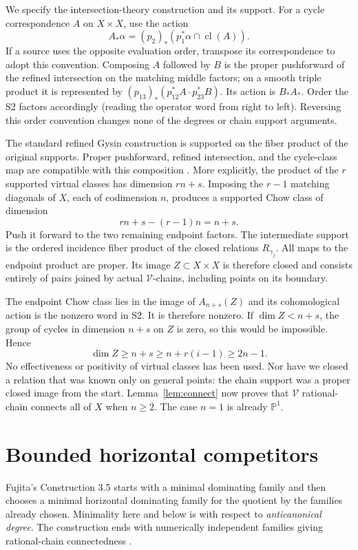 \documentclass[11pt]{article}
\theoremstyle{definition}\newtheorem{definition}[theorem]{Definition}
\theoremstyle{remark}\newtheorem{remark}[theorem]{Remark}
\newcommand{\PP}{\mathbb P}
\begin{document}
We specify the intersection-theory construction and its support. For a
cycle correspondence $A$ on $X\times X$, use the action
\[
 A_*\alpha=(p_2)_*(p_1^*\alpha\mathbin{\cap}\operatorname{cl}(A)).
\]
If a source uses the opposite evaluation order, transpose its correspondence
to adopt this convention. Composing $A$ followed by $B$ is the proper
pushforward of the refined intersection on the matching middle factors;
on a smooth triple product it is represented by
$(p_{13})_*(p_{12}^*A\cdot p_{23}^*B)$. Its action is $B_*A_*$.
Order the S2 factors accordingly (reading the operator word from right to
left). Reversing this order convention changes none of the degrees or chain
support arguments.

The standard refined Gysin construction is supported on the fiber product
of the original supports. Proper pushforward, refined intersection, and
the cycle-class map are compatible with this composition
\cite[\S\S6.2, 16.1, 19.1--19.2]{fulton}. More explicitly, the product of
the $r$ supported virtual classes has dimension $rn+s$. Imposing the
$r-1$ matching diagonals of $X$, each of codimension $n$, produces a
supported Chow class of dimension
\begin{equation}\label{eq:cycle-dim}
 rn+s-(r-1)n=n+s.
\end{equation}
Push it forward to the two remaining endpoint factors. The intermediate
support is the ordered incidence fiber product of the closed relations
$R_{\gamma_j}$. All maps to the endpoint product are proper. Its image
$Z\subset X\times X$ is therefore closed and consists entirely of pairs
joined by actual $\mathcal V$-chains, including points on its boundary.

The endpoint Chow class lies in the image of $A_{n+s}(Z)$ and its
cohomological action is the nonzero word in S2. It is therefore nonzero.
If $\dim Z<n+s$, the group of cycles in dimension $n+s$ on $Z$ is zero,
so this would be impossible. Hence
\[
 \dim Z\ge n+s\ge n+r(i-1)\ge2n-1.
\]
No effectiveness or positivity of virtual classes has been used. Nor have
we closed a relation that was known only on general points: the chain
support was a proper closed image from the start. Lemma~\ref{lem:connect}
now proves that $\mathcal V$ rational-chain connects all of $X$ when
$n\ge2$. The case $n=1$ is already $\PP^1$.

\section{Bounded horizontal competitors}\label{sec:horizontal}
Fujita's Construction 3.5 starts with a minimal dominating family and then
chooses a minimal horizontal dominating family for the quotient by the
families already chosen. Minimality here and below is with respect to
\emph{anticanonical degree}. The construction ends with numerically
independent families giving rational-chain connectedness
\cite[Definitions 2.1--2.2, Construction 3.5]{fujita}.
\end{document}
